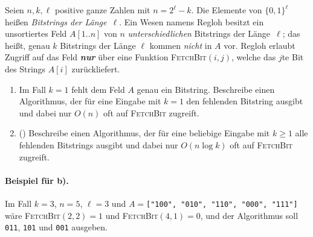 \documentclass{uebung_cs}
\begin{document}
\begin{aufgabe}
  Seien $n,k,\ell$ positive ganze Zahlen mit $n=2^\ell-k$.
  Die Elemente von $\{0,1\}^\ell$ heißen \emph{Bitstrings der Länge~$\ell$}.
  Ein Wesen namens Regloh besitzt ein unsortiertes Feld $A[1..n]$ von $n$ \emph{unterschiedlichen} Bitstrings der Länge~$\ell$; das heißt, genau $k$ Bitstrings der Länge $\ell$ kommen \emph{nicht} in $A$ vor.
  Regloh erlaubt Zugriff auf das Feld \emph{\textbf{nur}} über eine Funktion \textsc{FetchBit}$(i,j)$, welche das $j$te Bit des Strings $A[i]$ zurückliefert.
  \begin{enumerate}
    \item \mittel Im Fall $k=1$ fehlt dem Feld $A$ genau ein Bitstring. Beschreibe einen Algorithmus, der für eine Eingabe mit $k=1$ den fehlenden Bitstring ausgibt und dabei nur $O(n)$ oft auf \textsc{FetchBit} zugreift.
    \item \note (\hard) Beschreibe einen Algorithmus, der für eine beliebige Eingabe mit $k\ge 1$ alle fehlenden Bitstrings ausgibt und dabei nur $O(n\log k)$ oft auf \textsc{FetchBit} zugreift.
  \end{enumerate}

  \paragraph{Beispiel für b).}
  Im Fall $k=3$, $n=5$, $\ell=3$ und $A=$\texttt{["100", "010", "110", "000", "111"]}
  wäre \textsc{FetchBit}$(2,2)=1$ und \textsc{FetchBit}$(4,1)=0$, und der Algorithmus soll \texttt{011}, \texttt{101} und \texttt{001} ausgeben.

\end{aufgabe}


\end{document}
